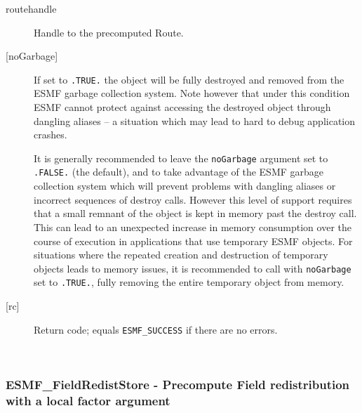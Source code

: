      \begin{description}
     \item [routehandle]
       Handle to the precomputed Route.
     \item[{[noGarbage]}]
       If set to {\tt .TRUE.} the object will be fully destroyed and removed
       from the ESMF garbage collection system. Note however that under this 
       condition ESMF cannot protect against accessing the destroyed object 
       through dangling aliases -- a situation which may lead to hard to debug 
       application crashes.
   
       It is generally recommended to leave the {\tt noGarbage} argument
       set to {\tt .FALSE.} (the default), and to take advantage of the ESMF 
       garbage collection system which will prevent problems with dangling
       aliases or incorrect sequences of destroy calls. However this level of
       support requires that a small remnant of the object is kept in memory
       past the destroy call. This can lead to an unexpected increase in memory
       consumption over the course of execution in applications that use 
       temporary ESMF objects. For situations where the repeated creation and 
       destruction of temporary objects leads to memory issues, it is 
       recommended to call with {\tt noGarbage} set to {\tt .TRUE.}, fully 
       removing the entire temporary object from memory.
     \item [{[rc]}]
       Return code; equals {\tt ESMF\_SUCCESS} if there are no errors.
     \end{description}
   
 
\mbox{}\hrulefill\ 
 
\subsubsection [ESMF\_FieldRedistStore] {ESMF\_FieldRedistStore - Precompute Field redistribution with a local factor argument }


